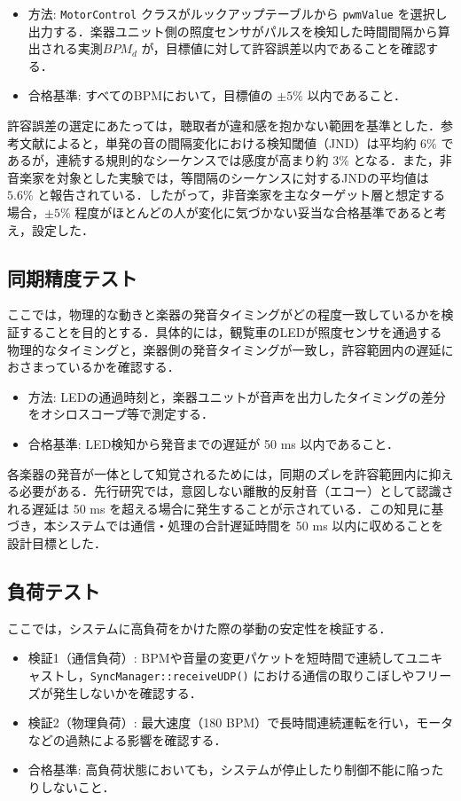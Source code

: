 \documentclass[uplatex,dvipdfmx]{jlreq}
\begin{document}
\begin{itemize}
    \item 方法: \texttt{MotorControl} クラスがルックアップテーブルから \texttt{pwmValue} を選択し出力する．楽器ユニット側の照度センサがパルスを検知した時間間隔から算出される実測$BPM_d$ が，目標値に対して許容誤差以内であることを確認する．
    \item 合格基準: すべてのBPMにおいて，目標値の $\pm 5\%$ 以内であること．
\end{itemize}

許容誤差の選定にあたっては，聴取者が違和感を抱かない範囲を基準とした．参考文献\cite{ref:tempo1993}によると，単発の音の間隔変化における検知閾値（JND）は平均約 $6\%$ であるが，連続する規則的なシーケンスでは感度が高まり約 $3\%$ となる．また，非音楽家を対象とした実験では，等間隔のシーケンスに対するJNDの平均値は $5.6\%$ と報告されている．したがって，非音楽家を主なターゲット層と想定する場合，$\pm 5\%$ 程度がほとんどの人が変化に気づかない妥当な合格基準であると考え，設定した．

\subsection{同期精度テスト}
ここでは，物理的な動きと楽器の発音タイミングがどの程度一致しているかを検証することを目的とする．具体的には，観覧車のLEDが照度センサを通過する物理的なタイミングと，楽器側の発音タイミングが一致し，許容範囲内の遅延におさまっているかを確認する．

\begin{itemize}
    \item 方法: LEDの通過時刻と，楽器ユニットが音声を出力したタイミングの差分をオシロスコープ等で測定する．
    \item 合格基準: LED検知から発音までの遅延が 50 ms 以内であること．
\end{itemize}

各楽器の発音が一体として知覚されるためには，同期のズレを許容範囲内に抑える必要がある．先行研究\cite{ref:haas1951}では，意図しない離散的反射音（エコー）として認識される遅延は 50 ms を超える場合に発生することが示されている．この知見に基づき，本システムでは通信・処理の合計遅延時間を 50 ms 以内に収めることを設計目標とした．

\subsection{負荷テスト}
ここでは，システムに高負荷をかけた際の挙動の安定性を検証する．

\begin{itemize}
    \item 検証1（通信負荷）: BPMや音量の変更パケットを短時間で連続してユニキャストし，\texttt{SyncManager::receiveUDP()} における通信の取りこぼしやフリーズが発生しないかを確認する．
    \item 検証2（物理負荷）: 最大速度（180 BPM）で長時間連続運転を行い，モータなどの過熱による影響を確認する．
    \item 合格基準: 高負荷状態においても，システムが停止したり制御不能に陥ったりしないこと．
\end{itemize}
\end{document}
